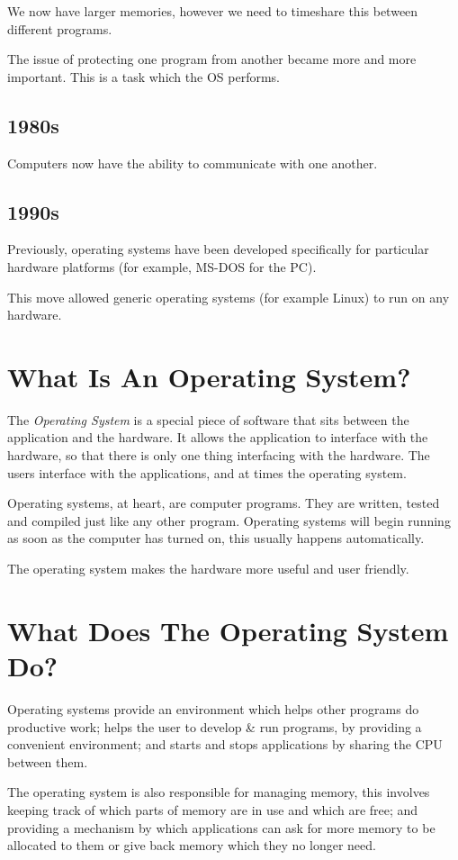 We now have larger memories, however we need to timeshare this between different programs.

The issue of protecting one program from another became more and more important. This is a task which the OS performs. 

\subsection*{1980s}
Computers now have the ability to communicate with one another. 

\subsection*{1990s}
Previously, operating systems have been developed specifically for particular hardware platforms (for example, MS-DOS for the PC).

This move allowed generic operating systems (for example Linux) to run on any hardware. 

\section*{What Is An Operating System?}
The \textit{Operating System} is a special piece of software that sits between the application and the hardware. It allows the application to interface with the hardware, so that there is only one thing interfacing with the hardware. The users interface with the applications, and at times the operating system.

Operating systems, at heart, are computer programs. They are written, tested and compiled just like any other program. Operating systems will begin running as soon as the computer has turned on, this usually happens automatically. 

The operating system makes the hardware more useful and user friendly.

\section*{What Does The Operating System Do?}
Operating systems provide an environment which helps other programs do productive work; helps the user to develop \& run programs, by providing a convenient environment; and starts and stops applications by sharing the CPU between them.

The operating system is also responsible for managing memory, this involves keeping track of which parts of memory are in use and which are free; and providing a mechanism by which applications can ask for more memory to be allocated to them or give back memory which they no longer need.

